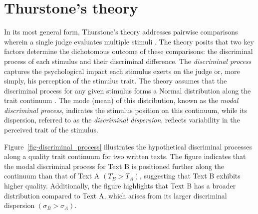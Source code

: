 \documentclass[
  authoryear,
  review,
  1p]{elsarticle}
\begin{document}
\section{Thurstone's theory}\label{sec-thurstone_theory}

In its most general form, Thurstone's theory addresses pairwise
comparisons wherein a single judge evaluates multiple stimuli
\citep{Thurstone_1927b}. The theory posits that two key factors
determine the dichotomous outcome of these comparisons: the discriminal
process of each stimulus and their discriminal difference. The
\emph{discriminal process} captures the psychological impact each
stimulus exerts on the judge or, more simply, his perception of the
stimulus trait. The theory assumes that the discriminal process for any
given stimulus forms a Normal distribution along the trait continuum
\citep{Thurstone_1927b}. The mode (mean) of this distribution, known as
the \emph{modal discriminal process}, indicates the stimulus position on
this continuum, while its dispersion, referred to as the
\emph{discriminal dispersion}, reflects variability in the perceived
trait of the stimulus.

Figure~\ref{fig-discriminal_process} illustrates the hypothetical
discriminal processes along a quality trait continuum for two written
texts. The figure indicates that the modal discriminal process for Text
B is positioned further along the continuum than that of Text A
\((T_{B} > T_{A})\), suggesting that Text B exhibits higher quality.
Additionally, the figure highlights that Text B has a broader
distribution compared to Text A, which arises from its larger
discriminal dispersion \((\sigma_{B} > \sigma_{A})\).
\end{document}
